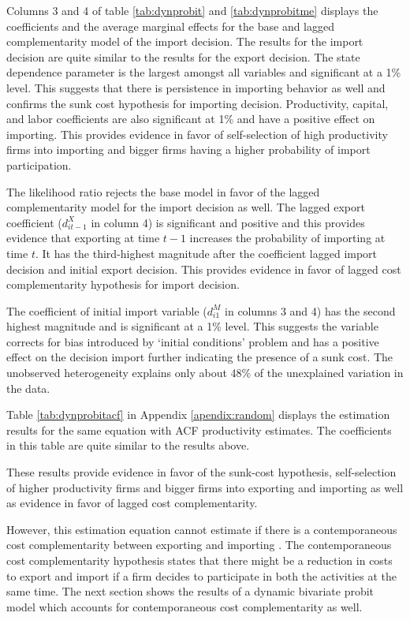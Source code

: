 \documentclass[12pt]{article}
\begin{document}
 Columns 3 and 4 of table \ref{tab:dynprobit} and
  \ref{tab:dynprobitme} displays the coefficients and the average
  marginal effects for the base and lagged complementarity model of the
  import decision. The results for the import decision are quite similar to the
 results for the export decision. The state dependence parameter is the largest
  amongst all variables and
  significant at a 1\% level. This suggests that there is  persistence in
  importing behavior as well and confirms the sunk cost hypothesis for
  importing decision. 
Productivity, capital, and labor coefficients are also significant at 1\%
  and have a 
  positive effect on importing. This provides evidence in favor of
  self-selection of high productivity firms into importing and 
  bigger firms having a higher probability of import participation.  

The likelihood ratio rejects the base model in favor of the lagged
complementarity model for the import decision as well. The lagged export coefficient ($d_{it-1}^{X}$ in column 4) is
  significant and positive and this provides evidence that exporting
  at time $t-1$ increases the probability of importing at time $t$. It
  has the third-highest magnitude after the coefficient lagged import
  decision and initial export decision.  This
provides  evidence in favor of 
  lagged cost complementarity hypothesis for
  import decision.  

The coefficient of initial import variable ($d_{i1}^{M}$ in columns 3
and 4) has the
second highest magnitude  and is 
  significant at a 1\% level. This suggests the variable corrects for
  bias introduced by `initial conditions' problem and has a positive
  effect on the decision import further indicating the presence of a
  sunk cost. The
  unobserved heterogeneity  explains only about 48\% of the unexplained
  variation in the data.  

Table \ref{tab:dynprobitacf} in Appendix \ref{apendix:random} displays the estimation results for the same
equation with ACF productivity estimates. The coefficients in this
table are quite similar to the results above. 

These results provide evidence in favor of  the sunk-cost hypothesis,
self-selection of higher productivity firms and bigger firms into
exporting and importing as well as evidence in favor of lagged cost
complementarity. 

However, this estimation equation cannot estimate if
there is a contemporaneous cost complementarity between exporting
and importing . The contemporaneous cost complementarity hypothesis
states that there might be a reduction in costs to export and import if
a firm decides to participate in both the activities at the same time.
The next section shows the results of a dynamic
bivariate probit model which accounts for contemporaneous cost complementarity
as well. 
\end{document}
